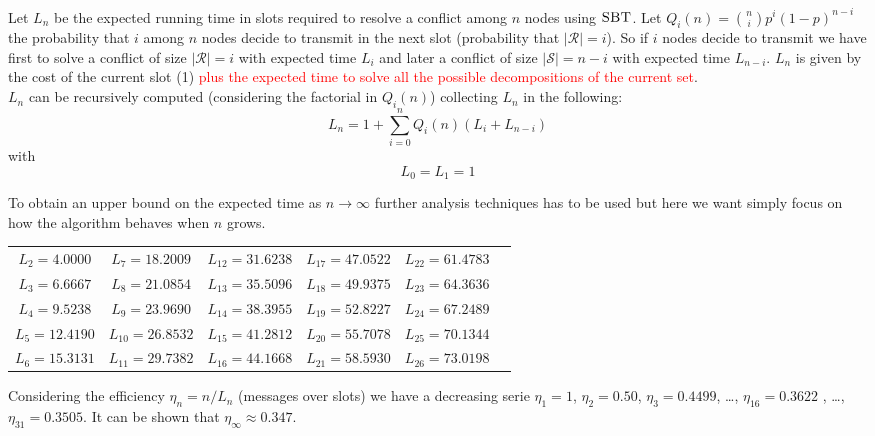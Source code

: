 \documentclass[12pt,a4paper]{report}
\newcommand{\algname}[1]{\ensuremath{\mbox{\sc #1}}}
\begin{document}
Let $L_{n}$ be the expected running time in slots required to resolve a conflict among $n$ nodes using \algname{SBT}.
Let $Q_{i}(n)={n\choose i} p^{i} (1-p)^{n-i}$ the probability that $i$ among $n$ nodes decide to transmit in the next slot (probability that $|\mathcal{R}|=i$). So if $i$ nodes decide to transmit we have first to solve a conflict of size $|\mathcal{R}|=i$ with expected time $L_{i}$ and later a conflict of size $|\mathcal{S}|=n-i$ with expected time $L_{n-i}$. $L_{n}$ is given by the cost of the current slot (1) \textcolor{red}{plus the expected time to solve all the possible decompositions of the current set}.\\
$L_{n}$ can be recursively computed (considering the factorial in $Q_{i}(n)$) collecting  $L_{n}$ in the following:
\begin{equation}
L_{n} = 1 + \sum_{i=0}^{n} Q_{i}(n) (L_{i}+L_{n-i})
\end{equation}
with
\begin{equation*}
L_{0} = L_{1}  = 1
\end{equation*}

To obtain an upper bound on the expected time as $ n \rightarrow \infty$ further analysis techniques has to be used but here we want simply focus on how the algorithm behaves when $n$ grows.\\

\begin{center}
\begin{tabular}{cccccc}
$L_{2} = 4.0000 $&$L_{7} = 18.2009 $  &$L_{12} = 31.6238 $  &$L_{17} = 47.0522 $  &$L_{22} = 61.4783 $ \\ 
$L_{3} = 6.6667 $&$L_{8} = 21.0854 $  &$L_{13} = 35.5096 $  &$L_{18} = 49.9375 $  &$L_{23} = 64.3636 $ \\ 
$L_{4} = 9.5238 $&$L_{9} = 23.9690 $  &$L_{14} = 38.3955 $  &$L_{19} = 52.8227 $  &$L_{24} = 67.2489 $ \\ 
$L_{5} = 12.4190 $&$L_{10} = 26.8532 $  &$L_{15} = 41.2812 $  &$L_{20} = 55.7078 $  &$L_{25} = 70.1344 $ \\  
$L_{6} = 15.3131 $&$L_{11} = 29.7382 $  &$L_{16} = 44.1668 $  &$L_{21} = 58.5930 $  &$L_{26} = 73.0198 $ \\  
\end{tabular} 
\end{center}


Considering the efficiency $\eta_{n}=n/L_{n}$ (messages over slots) we have a decreasing serie $\eta_{1}=1$, $\eta_{2}=0.50$, $\eta_{3}=0.4499$, \dots, $\eta_{16}=0.3622$ , \dots, $\eta_{31}=0.3505$. It can be shown \cite{capetanakis} that $\eta_{\infty} \approx 0.347$.\\
\end{document}
